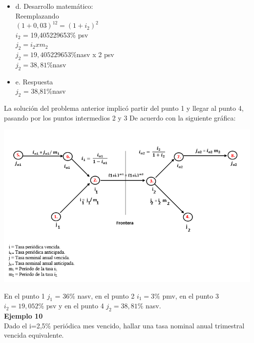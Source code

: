 \begin{itemize}
	\item d. Desarrollo matemático:\\
	Reemplazando\\
	$(1+0,03)^{12} = (1+i_2)^{2}$\\
	$i_{2}$ = 19,405229653\% psv\\
	$j_{2} = i_{2} x m_{2}$\\
	$j_{2} = 19,405229653$\%nasv x 2 psv\\
    $j_{2} = 38,81$\%nasv\\
	\item e. Respuesta\\
	
	$j_{2}$ = 38,81\%nasv\\
\end{itemize}

La solución del problema anterior implicó partir del punto 1 y llegar al punto 4, pasando por los puntos intermedios 2 y 3 De acuerdo con la siguiente gráfica:

\begin{center}
		\includegraphics[height = 9.0 cm]{general}\\
\end{center}

En el punto 1 $j_{1}$ = 36\% nasv, en el punto 2 $i_{1} = 3\%$ pmv, en el punto 3 $i_{2} = 19,052$\% psv y en el punto 4 $j_{2} = 38,81\%$ nasv.\\

\textbf{Ejemplo 10}\\

Dado el i=2,5\% periódica mes vencido, hallar una tasa nominal anual trimestral vencida equivalente.\\

